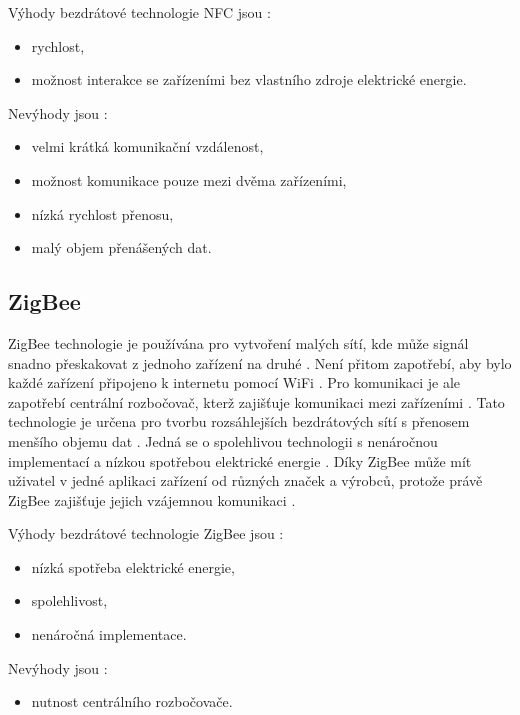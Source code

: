 Výhody bezdrátové technologie NFC jsou \cite{Bezdrat_muni}:
\begin{itemize}
  \item rychlost, %
  \item možnost interakce se zařízeními bez vlastního zdroje elektrické energie.
\end{itemize}

Nevýhody jsou \cite{Bezdrat_muni}:
\begin{itemize}
  \item velmi krátká komunikační vzdálenost,
  \item možnost komunikace pouze mezi dvěma zařízeními, 
  \item nízká rychlost přenosu,
  \item malý objem přenášených dat.
\end{itemize}

\subsection{ZigBee} %
ZigBee technologie je používána pro vytvoření malých sítí, kde může signál snadno přeskakovat z jednoho zařízení na druhé \cite{ZigBee_smart}.
Není přitom zapotřebí, aby bylo každé zařízení připojeno k internetu pomocí WiFi \cite{ZigBee_smart}. Pro komunikaci je ale zapotřebí centrální 
rozbočovač, kterž zajišťuje komunikaci mezi zařízeními \cite{ZigBee_smart}. Tato technologie je určena pro tvorbu rozsáhlejších bezdrátových sítí
s přenosem menšího objemu dat \cite{ZigBee_smart}. Jedná se o spolehlivou technologii s nenáročnou implementací a nízkou spotřebou elektrické energie 
\cite{ZigBee_smart}. Díky ZigBee může mít uživatel v jedné aplikaci zařízení 
od různých značek a výrobců, protože právě ZigBee zajišťuje jejich vzájemnou komunikaci \cite{ZigBee_smart}.

Výhody bezdrátové technologie ZigBee jsou \cite{ZigBee_smart}:
\begin{itemize}
  \item nízká spotřeba elektrické energie,
  \item spolehlivost, 
  \item nenáročná implementace.
\end{itemize}

Nevýhody jsou \cite{ZigBee_smart}:
\begin{itemize}
  \item nutnost centrálního rozbočovače.
\end{itemize}

